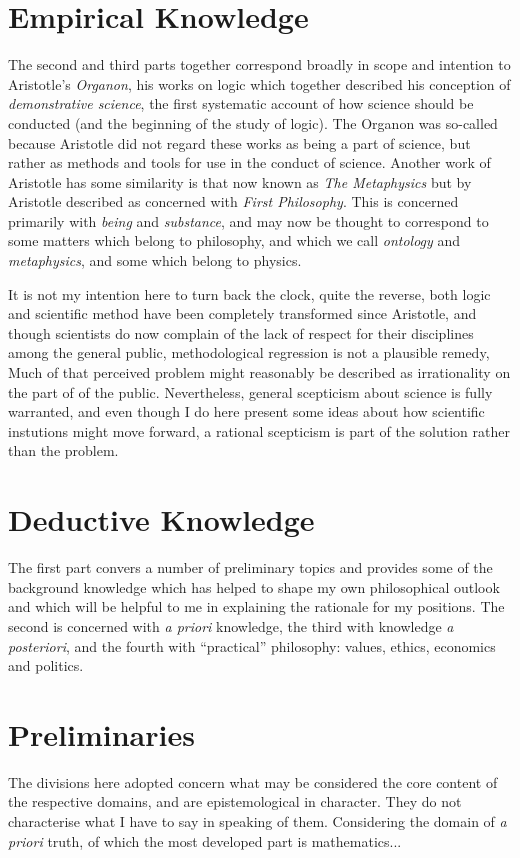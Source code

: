 \section{Empirical Knowledge}

The second and third parts together correspond broadly in scope and intention to Aristotle's \emph{Organon}, his works on logic which together described his conception of \emph{demonstrative science},  the first systematic account of how science should be conducted (and the beginning of the study of logic).
The Organon was so-called because Aristotle did not regard these works as being a part of science, but rather as methods and tools for use in the conduct of science.
Another work of Aristotle has some similarity is that now known as \emph{The Metaphysics} but by Aristotle described as concerned with \emph{First Philosophy}.
This is concerned primarily with \emph{being} and \emph{substance}, and may now be thought to correspond to some matters which belong to philosophy, and which we call \emph{ontology} and \emph{metaphysics}, and some which belong to physics.

It is not my intention here to turn back the clock, quite the reverse, both logic and scientific method have been completely transformed since Aristotle, and though scientists do now complain of the lack of respect for their disciplines among the general public, methodological regression is not a plausible remedy,
Much of that perceived problem might reasonably be described as irrationality on the part of of the public.
Nevertheless, general scepticism about science is fully warranted, and even though I do here present some ideas about how scientific instutions might move forward, a rational scepticism is part of the solution rather than the problem.


\section{Deductive Knowledge}

The first part convers a number of preliminary topics and provides some of the background knowledge which has helped to shape my own philosophical outlook and which will be helpful to me in explaining the rationale for my positions.
The second is concerned with \emph{a priori} knowledge, the third with knowledge \emph{a posteriori}, and the fourth with ``practical'' philosophy: values, ethics, economics and politics.

\section{Preliminaries}

The divisions here adopted concern what may be considered the core content of the respective domains, and are epistemological in character.
They do not characterise what I have to say in speaking of them.
Considering the domain of \emph{a priori} truth, of which the most developed part is mathematics...



